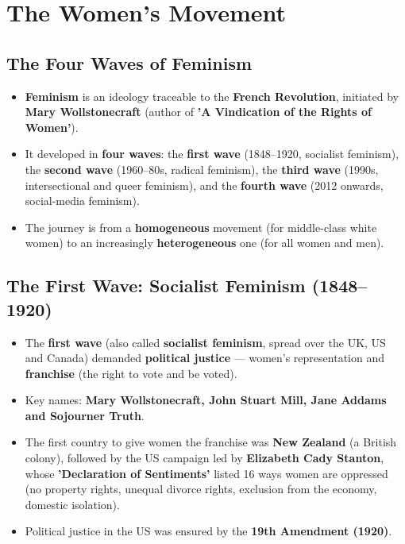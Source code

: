 \chapter{The Women's Movement}

\section{The Four Waves of Feminism}

\begin{KeyConcept}
\begin{itemize}
\item \textbf{Feminism} is an ideology traceable to the \textbf{French Revolution}, initiated by \textbf{Mary Wollstonecraft} (author of \textbf{'A Vindication of the Rights of Women'}).
\item It developed in \textbf{four waves}: the \textbf{first wave} (1848--1920, socialist feminism), the \textbf{second wave} (1960--80s, radical feminism), the \textbf{third wave} (1990s, intersectional and queer feminism), and the \textbf{fourth wave} (2012 onwards, social-media feminism).
\item The journey is from a \textbf{homogeneous} movement (for middle-class white women) to an increasingly \textbf{heterogeneous} one (for all women and men).
\end{itemize}
\end{KeyConcept}

\section{The First Wave: Socialist Feminism (1848--1920)}

\begin{KeyConcept}
\begin{itemize}
\item The \textbf{first wave} (also called \textbf{socialist feminism}, spread over the UK, US and Canada) demanded \textbf{political justice} --- women's representation and \textbf{franchise} (the right to vote and be voted).
\item Key names: \textbf{Mary Wollstonecraft, John Stuart Mill, Jane Addams and Sojourner Truth}.
\item The first country to give women the franchise was \textbf{New Zealand} (a British colony), followed by the US campaign led by \textbf{Elizabeth Cady Stanton}, whose \textbf{'Declaration of Sentiments'} listed 16 ways women are oppressed (no property rights, unequal divorce rights, exclusion from the economy, domestic isolation).
\item Political justice in the US was ensured by the \textbf{19th Amendment (1920)}.
\end{itemize}
\end{KeyConcept}

